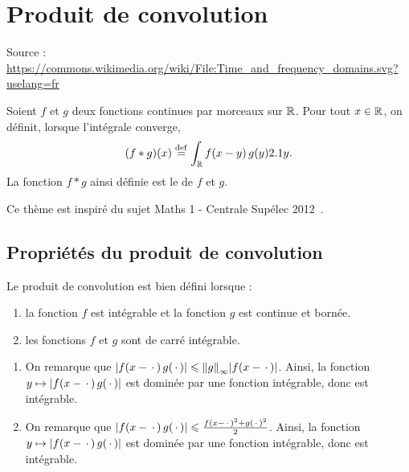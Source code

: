\section{Produit de convolution} 


\begin{marginfigure}[0cm]
    \centering
    
    \caption{Source : \url{https://commons.wikimedia.org/wiki/File:Time_and_frequency_domains.svg?uselang=fr}}
\end{marginfigure}

\begin{defi}
Soient $f$ et $g$ deux fonctions continues par morceaux sur $\mathbb{R}$. Pour tout $x \in \mathbb{R}$, on définit, lorsque l'intégrale converge,
\begin{equation}\label{defconvolution}
(f \ast g)(x) \overset{\mathrm{\tiny def}}{=} \int_{\mathbb{R}} f(x-y) \, g(y) 2.1 y.
\end{equation}
La fonction $f \ast g$ ainsi définie est le  de $f$ et $g$.
\end{defi}

Ce thème est inspiré du sujet Maths 1 - Centrale Supélec 2012~\cite{cs_1_2012}.

\subsection{Propriétés du produit de convolution}

\begin{theo}
Le produit de convolution est bien défini lorsque :
\begin{enumerate}
\item la fonction $f$ est intégrable et la fonction $g$ est continue et bornée.

\item les fonctions $f$ et $g$ sont de carré intégrable.
\end{enumerate}
\end{theo}

\begin{demo}
\begin{enumerate}
\item On remarque que $\mathopen{}\left| f(x - \,\cdot\,) \, g(\,\cdot\,) \right| \leqslant \norm{g}_\infty \mathopen{}\left| f(x - \,\cdot\,) \right|$. Ainsi, la fonction $y \mapsto \mathopen{}\left| f(x - \,\cdot\,) \, g(\,\cdot\,) \right|$ est dominée par une fonction intégrable, donc est intégrable.

\item On remarque que $\mathopen{}\left| f(x - \,\cdot\,) \, g(\,\cdot\,) \right| \leqslant \frac{f(x - \,\cdot\,)^2 + g(\,\cdot\,)^2}{2}$. Ainsi, la fonction $y \mapsto \mathopen{}\left| f(x - \,\cdot\,) \, g(\,\cdot\,) \right|$ est dominée par une fonction intégrable, donc est intégrable.
\end{enumerate}
\end{demo}

